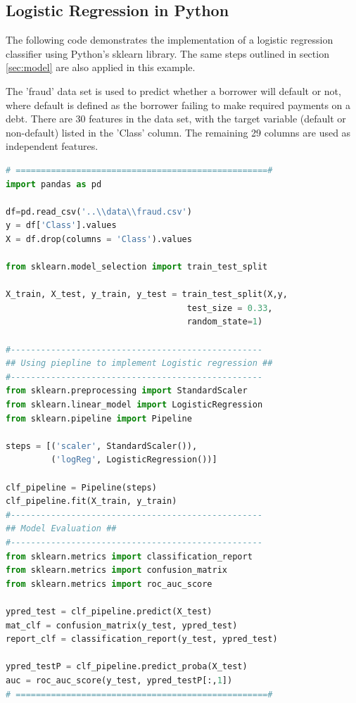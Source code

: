 \newpage

\subsection{Logistic Regression in Python}

The following code demonstrates the implementation of a logistic regression classifier using Python's sklearn library. The same steps outlined in section \ref{sec:model} are also applied in this example.

The 'fraud' data set \cite{web:fraudData} is used to predict whether a borrower will default or not, where default is defined as the borrower failing to make required payments on a debt. There are 30 features in the data set, with the target variable (default or non-default) listed in the 'Class' column. The remaining 29 columns are used as independent features.

\begin{lstlisting}[language=Python]
# ==================================================#
import pandas as pd

df=pd.read_csv('..\\data\\fraud.csv')
y = df['Class'].values
X = df.drop(columns = 'Class').values

from sklearn.model_selection import train_test_split

X_train, X_test, y_train, y_test = train_test_split(X,y,
                                    test_size = 0.33,
                                    random_state=1)

#--------------------------------------------------
## Using piepline to implement Logistic regression ##
#--------------------------------------------------
from sklearn.preprocessing import StandardScaler
from sklearn.linear_model import LogisticRegression
from sklearn.pipeline import Pipeline

steps = [('scaler', StandardScaler()),
         ('logReg', LogisticRegression())]

clf_pipeline = Pipeline(steps)
clf_pipeline.fit(X_train, y_train)
#--------------------------------------------------
## Model Evaluation ##
#--------------------------------------------------
from sklearn.metrics import classification_report
from sklearn.metrics import confusion_matrix
from sklearn.metrics import roc_auc_score

ypred_test = clf_pipeline.predict(X_test)
mat_clf = confusion_matrix(y_test, ypred_test)
report_clf = classification_report(y_test, ypred_test)

ypred_testP = clf_pipeline.predict_proba(X_test)
auc = roc_auc_score(y_test, ypred_testP[:,1])
# ==================================================#
\end{lstlisting}

